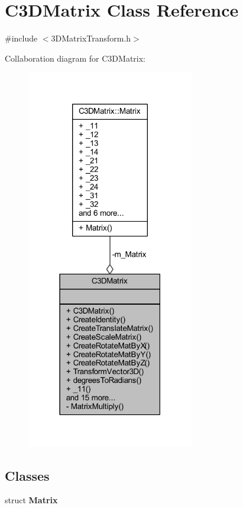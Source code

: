\section{C3\+D\+Matrix Class Reference}
\label{class_c3_d_matrix}


{\ttfamily \#include $<$3\+D\+Matrix\+Transform.\+h$>$}



Collaboration diagram for C3\+D\+Matrix\+:\nopagebreak
\begin{figure}[H]
\begin{center}
\leavevmode
\includegraphics[width=207pt]{de/d0a/class_c3_d_matrix__coll__graph}
\end{center}
\end{figure}
\subsection*{Classes}
\begin{DoxyCompactItemize}
\item 
struct {\bf Matrix}
\end{DoxyCompactItemize}
